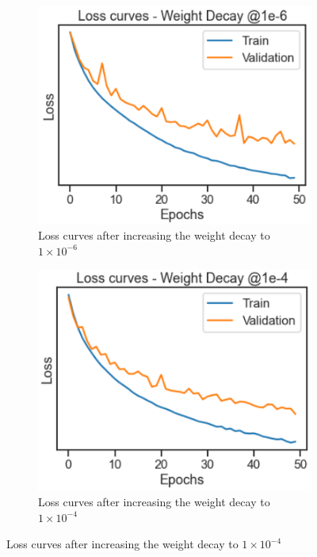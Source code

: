 \documentclass[a4paper, 12pt]{article}
\begin{document}
\begin{figure}[H]
\begin{subfigure}{.5\textwidth}
    \centering
    \includegraphics[width=1\textwidth, scale = 0.5]{Weightdecay0.PNG}
    \caption{Loss curves after increasing the weight decay to $1 \times 10^{-6}$}
    \label{fig:wd0}
\end{subfigure} \hfill
\begin{subfigure}{.4\textwidth}
    \centering
    \includegraphics[width=1.1\textwidth, scale = 0.5]{Weightdecay1.PNG}
    \caption{Loss curves after increasing the weight decay to $1 \times 10^{-4}$}

\end{subfigure}
\end{figure}
\end{document}
